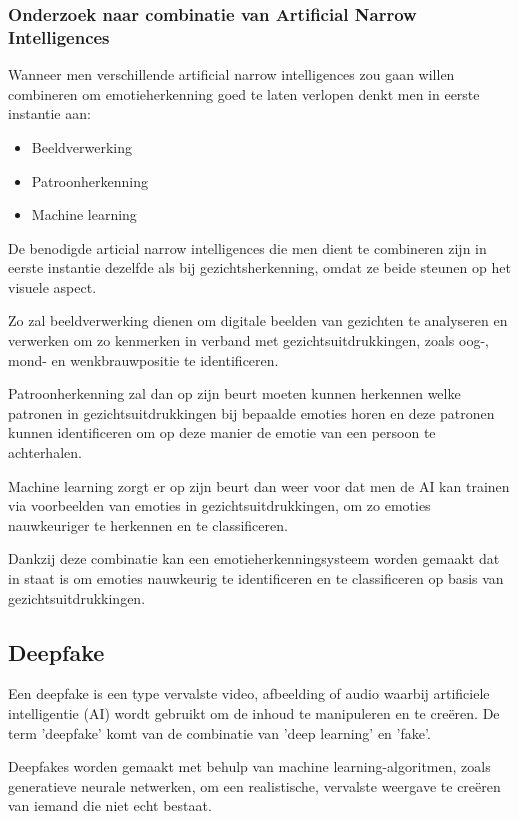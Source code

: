 \subsubsection{Onderzoek naar combinatie van Artificial Narrow Intelligences}

Wanneer men verschillende artificial narrow intelligences zou gaan willen combineren om emotieherkenning goed te laten verlopen denkt men in eerste instantie aan:

\begin{itemize}
    \item Beeldverwerking
    \item Patroonherkenning
    \item Machine learning
\end{itemize}

De benodigde articial narrow intelligences die men dient te combineren zijn in eerste instantie dezelfde als bij gezichtsherkenning, omdat ze beide steunen op het visuele aspect.

Zo zal beeldverwerking dienen om digitale beelden van gezichten te analyseren en verwerken om zo kenmerken in verband met gezichtsuitdrukkingen, zoals oog-, mond- en wenkbrauwpositie te identificeren.

Patroonherkenning zal dan op zijn beurt moeten kunnen herkennen welke patronen in gezichtsuitdrukkingen bij bepaalde emoties horen en deze patronen kunnen identificeren om op deze manier de emotie van een persoon te achterhalen.

Machine learning zorgt er op zijn beurt dan weer voor dat men de AI kan trainen via voorbeelden van emoties in gezichtsuitdrukkingen, om zo emoties nauwkeuriger te herkennen en te classificeren.

Dankzij deze combinatie kan een emotieherkenningsysteem worden gemaakt dat in staat is om emoties nauwkeurig te identificeren en te classificeren op basis van gezichtsuitdrukkingen.

\subsection{Deepfake}

Een deepfake is een type vervalste video, afbeelding of audio waarbij artificiele intelligentie (AI) wordt gebruikt om de inhoud te manipuleren en te creëren. De term 'deepfake' komt van de combinatie van 'deep learning' en 'fake'.

Deepfakes worden gemaakt met behulp van machine learning-algoritmen, zoals generatieve neurale netwerken, om een ​​realistische, vervalste weergave te creëren van iemand die niet echt bestaat.

